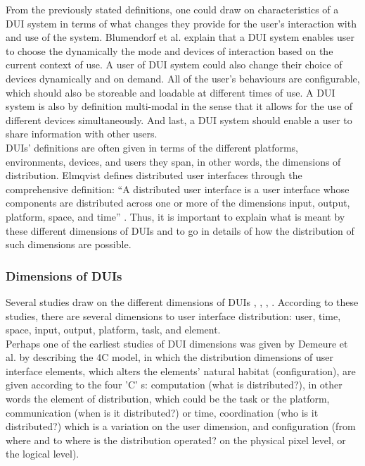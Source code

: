 From the previously stated definitions, one could draw on characteristics of a
DUI system in terms of what changes they provide for the user's interaction with
and use of the system. Blumendorf et al. \cite{blumendorf2011distributed}
explain that a DUI system enables user to choose the dynamically the mode and devices of interaction based
on the current context of use. A user of DUI system could also change their
choice of devices dynamically and on demand. All of the user's behaviours are
configurable, which should also be storeable and loadable at different times of
use. A DUI system is also by definition multi-modal in the sense that it allows
for the use of different devices simultaneously. And last, a DUI system
should enable a user to share information with other users.\\ 
DUIs' definitions are often given in terms of the different platforms,
environments, devices, and users they span, in other words, the dimensions of
distribution. Elmqvist defines distributed user interfaces through the
comprehensive definition: ``A distributed user interface is a user interface whose components are distributed across one
or more of the dimensions input, output, platform, space, and time''
\cite{elmqvist2011distributed}. Thus, it is important to explain what is meant
by these different dimensions of DUIs and to go in details of how the
distribution of such dimensions are possible.

\subsubsection{Dimensions of DUIs}
Several studies draw on the different dimensions of DUIs
\cite{melchior2011distributed}, \cite{demeure20084c},
\cite{elmqvist2011distributed}, \cite{vanderdonckt2010distributed}. According to
these studies, there are several dimensions to user interface distribution:
user, time, space, input, output, platform, task, and element.\\ 
Perhaps one of the earliest studies of DUI dimensions was
given by Demeure et al. by describing the 4C model, in
which the distribution dimensions of user interface elements, which alters the
elements' natural habitat (configuration), are given according to the four 'C'
s: computation (what is distributed?), in other words the element of
distribution, which could be the task or the platform, communication (when is it distributed?)
or time, coordination (who is it distributed?) which is a variation on the user
dimension, and configuration (from where and to where is the distribution operated? on the physical pixel level, or
the logical level)\cite{demeure20084c}.\\

